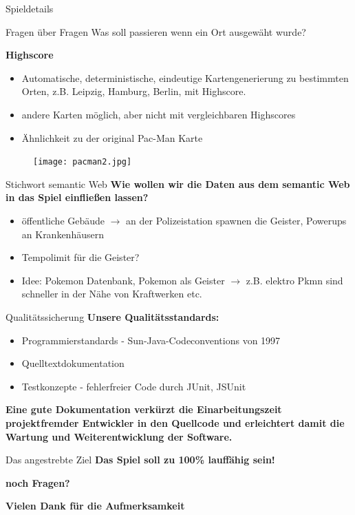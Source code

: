 \documentclass{beamer}
\begin{document}
\begin{frame}{Spieldetails}
\begin{block}{Fragen über Fragen}
Was soll passieren wenn ein Ort ausgewäht wurde?
\end{block}
\textbf{Highscore}
\begin{itemize}
\item Automatische, deterministische, eindeutige Kartengenerierung zu bestimmten Orten, z.B. Leipzig, Hamburg, Berlin, mit Highscore.
\item andere Karten möglich, aber nicht mit vergleichbaren Highscores
\item Ähnlichkeit zu der original Pac-Man Karte
\end{itemize}
\begin{figure}[htb]
  \centering
  \texttt{[image: pacman2.jpg]}
  \label{PNFs}
\end{figure} 
\end{frame}
\begin{frame}{Stichwort semantic Web}
\textbf{Wie wollen wir die Daten aus dem semantic Web in das Spiel einfließen lassen?}
\begin{itemize}
\item öffentliche Gebäude $\rightarrow$ an der Polizeistation spawnen die Geister, Powerups an Krankenhäusern
\item Tempolimit für die Geister?
\item Idee: Pokemon Datenbank, Pokemon als Geister $\rightarrow$ z.B. elektro Pkmn sind schneller in der Nähe von Kraftwerken etc. 
\end{itemize}
\end{frame}
\begin{frame}{Qualitätssicherung}
\textbf{Unsere Qualitätsstandards:}
\begin{itemize}
\item Programmierstandards - Sun-Java-Codeconventions von 1997
\item Quelltextdokumentation
\item Testkonzepte - fehlerfreier Code durch	 JUnit, JSUnit
\end{itemize}
\par\bigskip	
\textbf{Eine
gute Dokumentation verkürzt die Einarbeitungszeit projektfremder
Entwickler in den Quellcode und erleichtert damit die Wartung und
Weiterentwicklung der Software.}

\end{frame}
\begin{frame}{Das angestrebte Ziel}
\center  \textbf{Das Spiel soll zu 100\% lauffähig sein!}
\end{frame}
\begin{frame}
\center  \textbf{noch Fragen?}
\par\bigskip
\center  \textbf{Vielen Dank für die Aufmerksamkeit}

\end{frame}
\end{document}
